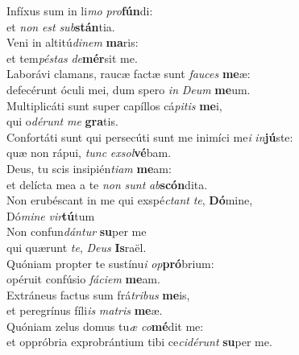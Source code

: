 \evenverse Infíxus sum in li\textit{mo} \textit{pro}\textbf{fún}di:~\*\\
\evenverse et \textit{non} \textit{est} \textit{sub}\textbf{stán}tia.\\
\oddverse Veni in altitú\textit{di}\textit{nem} \textbf{ma}ris:~\*\\
\oddverse et tem\textit{pé}\textit{stas} \textit{de}\textbf{mér}sit me.\\
\evenverse Laborávi clamans, raucæ factæ sunt \textit{fau}\textit{ces} \textbf{me}æ:~\*\\
\evenverse defecérunt óculi mei, dum spero \textit{in} \textit{De}\textit{um} \textbf{me}um.\\
\oddverse Multiplicáti sunt super capíllos cá\textit{pi}\textit{tis} \textbf{me}i,~\*\\
\oddverse qui o\textit{dé}\textit{runt} \textit{me} \textbf{gra}tis.\\
\evenverse Confortáti sunt qui persecúti sunt me inimíci me\textit{i} \textit{in}\textbf{jú}ste:~\*\\
\evenverse quæ non rápui, \textit{tunc} \textit{ex}\textit{sol}\textbf{vé}bam.\\
\oddverse Deus, tu scis insipién\textit{ti}\textit{am} \textbf{me}am:~\*\\
\oddverse et delícta mea a te \textit{non} \textit{sunt} \textit{ab}\textbf{scón}dita.\\
\evenverse Non erubéscant in me qui exspé\textit{ctant} \textit{te}, \textbf{Dó}mine,~\*\\
\evenverse Dó\textit{mi}\textit{ne} \textit{vir}\textbf{tú}tum\\
\oddverse Non confun\textit{dán}\textit{tur} \textbf{su}per me~\*\\
\oddverse qui quærunt \textit{te}, \textit{De}\textit{us} \textbf{Is}raël.\\
\evenverse Quóniam propter te sustínu\textit{i} \textit{op}\textbf{pró}brium:~\*\\
\evenverse opéruit confúsio \textit{fá}\textit{ci}\textit{em} \textbf{me}am.\\
\oddverse Extráneus factus sum frá\textit{tri}\textit{bus} \textbf{me}is,~\*\\
\oddverse et peregrínus fíli\textit{is} \textit{ma}\textit{tris} \textbf{me}æ.\\
\evenverse Quóniam zelus domus tu\textit{æ} \textit{co}\textbf{mé}dit me:~\*\\
\evenverse et oppróbria exprobrántium tibi ce\textit{ci}\textit{dé}\textit{runt} \textbf{su}per me.\\
